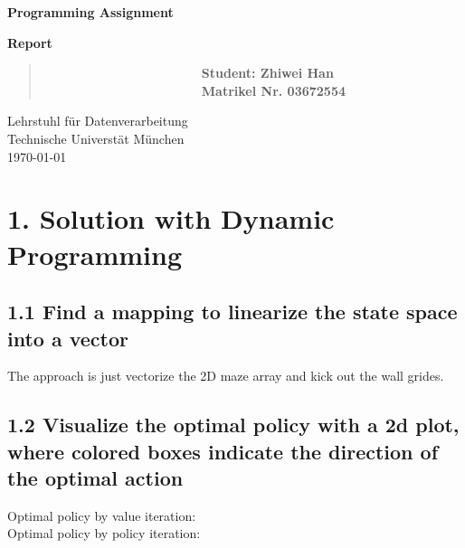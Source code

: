 \documentclass[12pt,a4paper,titlepage]{article}
\begin{document}
\begin{titlepage}
    \begin{center}
        \vspace*{3.5cm}
        
        \textbf{\huge{Programming Assignment}}
        \vspace{1cm}

        \textbf{\huge{Report}}

        \vspace{6cm}

        \begin{verse}
            \ \ \ \ \ \ \ \ \ \ \ \ \ \ \ \ \ \ \ \ \ \ \ \ \ \textbf{\large{Student: Zhiwei Han}}\\
            \ \ \ \ \ \ \ \ \ \ \ \ \ \ \ \ \ \ \ \ \ \ \ \ \ \textbf{\large{Matrikel Nr. 03672554
            }}\\
        \end{verse}


        
        \vspace{1cm}
        
        
        Lehrstuhl f\"ur Datenverarbeitung\\
        Technische Universt\"at M\"unchen\\
        \today
        
    \end{center}
\end{titlepage}



\setlength{\parindent}{0pt} \setlength{\parskip}{2ex plus 0.5ex
minus 0.2ex}


\section*{1. Solution with Dynamic Programming}
\subsection*{1.1 Find a mapping to linearize the state space into a vector}
The approach is just vectorize the 2D maze array and kick out the wall grides.
\subsection*{1.2 Visualize the optimal policy with a 2d plot, where colored boxes indicate the direction of the optimal action}
Optimal policy by value iteration:\\
[images]
Optimal policy by policy iteration:\\
[images]
\end{document}
